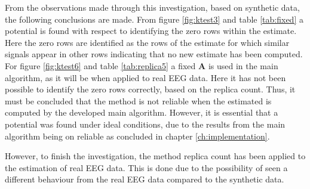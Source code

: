 \noindent
From the observations made through this investigation, based on synthetic data, the following conclusions are made.
From figure \ref{fig:ktest3} and table \ref{tab:fixed} a potential is found with respect to identifying the zero rows within the estimate. Here the zero rows are identified as the rows of the estimate for which similar signals appear in other rows indicating that no new estimate has been computed. 
For figure \ref{fig:ktest6} and table \ref{tab:replica5} a fixed $\textbf{A}$ is used in the main algorithm, as it will be when applied to real EEG data. Here it has not been possible to identify the zero rows correctly, based on the replica count. Thus, it must be concluded that the method is not reliable when the estimated is computed by the developed main algorithm. However, it is essential that a potential was found under ideal conditions, due to the results from the main algorithm being on reliable as concluded in chapter \ref{ch:implementation}. 

However, to finish the investigation, the method replica count has been applied to the estimation of real EEG data. This is done due to the possibility of seen a different behaviour from the real EEG data compared to the synthetic data. 







